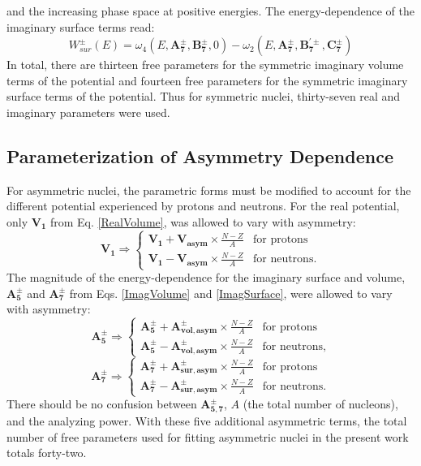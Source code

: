 \documentclass[twocolumn,secnumarabic,amssymb, nobibnotes, aps, prl,
superscriptaddress, nobalancelastpage]{revtex4}
\begin{document}
and the increasing phase space at positive energies.
The energy-dependence of the imaginary surface terms read:
\begin{equation} \label{ImagSurface}
    W_{sur}^{\pm}(E) = \omega_{4}(E, \mathbf{A_{7}^{\pm}}, \mathbf{B_{7}^{\pm}}, 0)
    - \omega_{2}(E, \mathbf{A_{7}^{\pm}}, \mathbf{B_{7}^{'\pm}}, \mathbf{C_{7}^{\pm}})
\end{equation}
In total, there are
thirteen free parameters for the symmetric imaginary volume terms of the
potential and fourteen free parameters for the symmetric imaginary surface terms
of the potential. Thus for symmetric nuclei, thirty-seven real and imaginary
parameters were used.

\subsection{Parameterization of Asymmetry Dependence}
For asymmetric nuclei,
the parametric forms must be modified to account for the different potential experienced by 
protons and neutrons. For the real potential, only $\mathbf{V_{1}}$ from Eq. \ref{RealVolume},
was allowed to vary with asymmetry:
\begin{equation}
    \mathbf{V_{1}} \Rightarrow \begin{cases}
        \mathbf{V_{1}} + \mathbf{V_{asym}}\times\frac{N-Z}{A} & \text{for protons}\\
        \mathbf{V_{1}} - \mathbf{V_{asym}}\times\frac{N-Z}{A} & \text{for neutrons}.
    \end{cases}
\end{equation}
The magnitude of the energy-dependence for the imaginary surface and volume,
$\mathbf{A_{5}^{\pm}}$ and $\mathbf{A_{7}^{\pm}}$ from Eqs. \ref{ImagVolume} and \ref{ImagSurface},
were allowed to vary with asymmetry:
\begin{equation}
    \mathbf{A_{5}^{\pm}} \Rightarrow \begin{cases}
        \mathbf{A_{5}^{\pm}} + \mathbf{A_{vol, asym}^{\pm}}\times\frac{N-Z}{A} & \text{for protons}\\
        \mathbf{A_{5}^{\pm}} - \mathbf{A_{vol, asym}^{\pm}}\times\frac{N-Z}{A} & \text{for neutrons},
    \end{cases}
\end{equation}
\begin{equation}
    \mathbf{A_{7}^{\pm}} \Rightarrow \begin{cases}
        \mathbf{A_{7}^{\pm}} + \mathbf{A_{sur, asym}^{\pm}}\times\frac{N-Z}{A} & \text{for protons}\\
        \mathbf{A_{7}^{\pm}} - \mathbf{A_{sur, asym}^{\pm}}\times\frac{N-Z}{A} & \text{for neutrons}.
    \end{cases}
\end{equation}
There should be no confusion between $\mathbf{A_{5,7}^{\pm}}$, $A$ (the total number
of nucleons), and the analyzing power. 
With these five additional asymmetric terms,
the total number of free parameters used for
fitting asymmetric nuclei in the present work totals forty-two.
\end{document}
